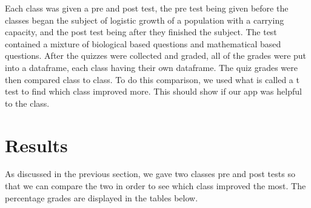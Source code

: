 \documentclass{article}\usepackage[]{graphicx}\usepackage[]{color}
\begin{document}
Each class was given a pre and post test, the pre test being given before the classes began the subject of logistic growth of a population with a carrying capacity, and the post test being after they finished the subject. The test contained a mixture of biological based questions and mathematical based questions. After the quizzes were collected and graded, all of the grades were put into a dataframe, each class having their own dataframe. The quiz grades were then compared class to class. To do this comparison, we used what is called a t test to find which class improved more. This should show if our app was helpful to the class.









\section{Results}



As discussed in the previous section, we gave two classes pre and post tests so that we can compare the two in order to see which class improved the most. The percentage grades are displayed in the tables below.
\end{document}
